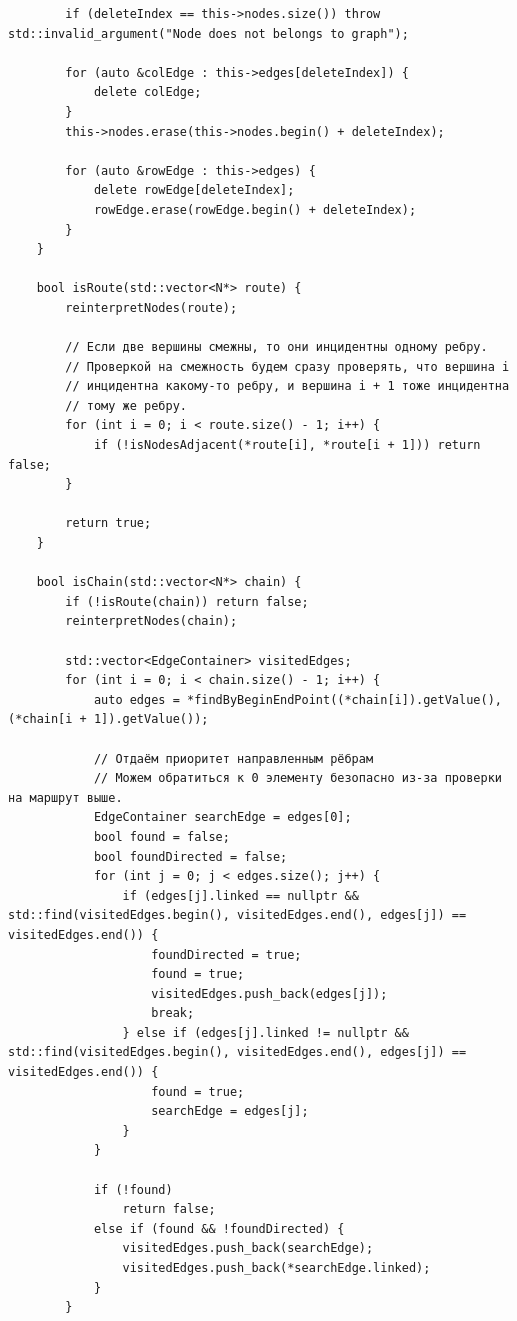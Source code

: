 \documentclass[a4paper,14pt]{extarticle}
\begin{document}
\begin{enumerate}[1.]
\begin{verbatim}
        if (deleteIndex == this->nodes.size()) throw std::invalid_argument("Node does not belongs to graph");

        for (auto &colEdge : this->edges[deleteIndex]) {
            delete colEdge;
        }
        this->nodes.erase(this->nodes.begin() + deleteIndex);

        for (auto &rowEdge : this->edges) {
            delete rowEdge[deleteIndex];
            rowEdge.erase(rowEdge.begin() + deleteIndex);
        }
    }

    bool isRoute(std::vector<N*> route) {
        reinterpretNodes(route);

        // Если две вершины смежны, то они инцидентны одному ребру.
        // Проверкой на смежность будем сразу проверять, что вершина i
        // инцидентна какому-то ребру, и вершина i + 1 тоже инцидентна
        // тому же ребру.
        for (int i = 0; i < route.size() - 1; i++) {
            if (!isNodesAdjacent(*route[i], *route[i + 1])) return false;
        }

        return true;
    }

    bool isChain(std::vector<N*> chain) {
        if (!isRoute(chain)) return false;
        reinterpretNodes(chain);
        
        std::vector<EdgeContainer> visitedEdges;
        for (int i = 0; i < chain.size() - 1; i++) {
            auto edges = *findByBeginEndPoint((*chain[i]).getValue(), (*chain[i + 1]).getValue());

            // Отдаём приоритет направленным рёбрам
            // Можем обратиться к 0 элементу безопасно из-за проверки на маршрут выше.
            EdgeContainer searchEdge = edges[0];
            bool found = false;
            bool foundDirected = false;
            for (int j = 0; j < edges.size(); j++) {
                if (edges[j].linked == nullptr && std::find(visitedEdges.begin(), visitedEdges.end(), edges[j]) == visitedEdges.end()) {
                    foundDirected = true;
                    found = true;
                    visitedEdges.push_back(edges[j]);
                    break;
                } else if (edges[j].linked != nullptr && std::find(visitedEdges.begin(), visitedEdges.end(), edges[j]) == visitedEdges.end()) {
                    found = true;
                    searchEdge = edges[j];
                }
            }
            
            if (!found) 
                return false;
            else if (found && !foundDirected) {
                visitedEdges.push_back(searchEdge);
                visitedEdges.push_back(*searchEdge.linked);
            } 
        }


\end{verbatim}
\end{enumerate}
\end{document}
